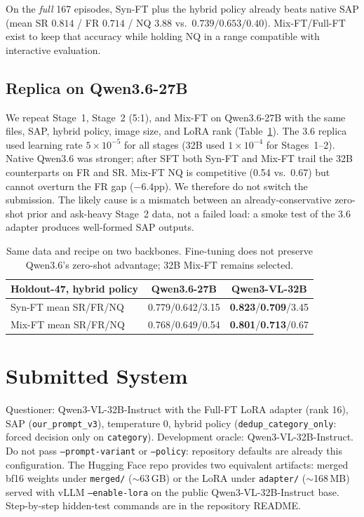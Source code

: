 \documentclass[10pt,a4paper]{article}
\begin{document}
On the \emph{full} 167 episodes, Syn-FT plus the hybrid policy already
beats native SAP (mean SR $0.814$ / FR $0.714$ / NQ $3.88$ vs.\
$0.739/0.653/0.40$). Mix-FT/Full-FT exist to keep that accuracy while holding NQ in a
range compatible with interactive evaluation.

\subsection{Replica on Qwen3.6-27B}
\label{sec:q36ft}
We repeat Stage~1, Stage~2 (5:1), and Mix-FT on Qwen3.6-27B with the
same files, SAP, hybrid policy, image size, and LoRA rank
(Table~\ref{tab:q36ft}). The 3.6 replica used learning rate
$5\times 10^{-5}$ for all stages (32B used $1\times 10^{-4}$ for
Stages~1--2). Native Qwen3.6 was stronger; after SFT both Syn-FT and
Mix-FT trail the 32B counterparts on FR and SR. Mix-FT NQ is
competitive (0.54 vs.\ 0.67) but cannot overturn the FR gap
($-6.4$pp). We therefore do not switch the submission.
The likely cause is a mismatch between an already-conservative
zero-shot prior and ask-heavy Stage~2 data, not a failed load: a
smoke test of the 3.6 adapter produces well-formed SAP outputs.

\begin{table}[h]
\centering
\small
\begin{tabular}{lcc}
\toprule
Holdout-47, hybrid policy & Qwen3.6-27B & Qwen3-VL-32B \\
\midrule
Syn-FT mean SR/FR/NQ & 0.779/0.642/3.15 & \textbf{0.823}/\textbf{0.709}/3.45 \\
Mix-FT mean SR/FR/NQ & 0.768/0.649/0.54 & \textbf{0.801}/\textbf{0.713}/0.67 \\
\bottomrule
\end{tabular}
\caption{Same data and recipe on two backbones. Fine-tuning does not
preserve Qwen3.6's zero-shot advantage; 32B Mix-FT remains selected.}
\label{tab:q36ft}
\end{table}

\section{Submitted System}

Questioner: Qwen3-VL-32B-Instruct with the Full-FT LoRA adapter
(rank 16), SAP (\texttt{our\_prompt\_v3}), temperature 0, hybrid policy
(\texttt{dedup\_category\_only}: forced decision only on
\texttt{category}). Development oracle: Qwen3-VL-32B-Instruct.
Do not pass \texttt{--prompt-variant} or \texttt{--policy}: repository
defaults are already this configuration.
The Hugging Face repo provides two equivalent artifacts: merged bf16
weights under \texttt{merged/} ($\sim$63\,GB) or the LoRA under
\texttt{adapter/} ($\sim$168\,MB) served with vLLM \texttt{--enable-lora}
on the public Qwen3-VL-32B-Instruct base. Step-by-step hidden-test
commands are in the repository README.
\end{document}

